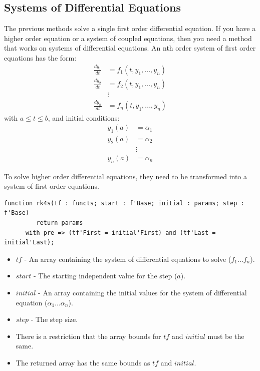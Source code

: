 \documentclass[10pt, openany]{book}
\newcommand{\indexfunc}[1]{\index[func]{#1}}
\begin{document}
\subsection{Systems of Differential Equations}
The previous methods solve a single first order differential equation.  If you have a higher order equation or a system of coupled equations, then you need a method that works on systems of differential equations.  An nth order system of first order equations has the form:
\begin{align*}
  \frac{dy_1}{dt} &= f_1(t, y_1, ..., y_n) \\
  \frac{dy_2}{dt} &= f_2(t, y_1, ..., y_n) \\
  &\vdots\\
  \frac{dy_n}{dt} &= f_n(t, y_1, ..., y_n)
\end{align*}
with $a\leq t\leq b$, and initial conditions:
\begin{align*}
  y_1(a) &= \alpha_1 \\
  y_2(a) &= \alpha_2 \\
  &\vdots \\
  y_n(a) &= \alpha_n
\end{align*}

To solve higher order differential equations, they need to be transformed into a system of first order equations.

\begin{lstlisting}
function rk4s(tf : functs; start : f'Base; initial : params; step : f'Base)
         return params
      with pre => (tf'First = initial'First) and (tf'Last = initial'Last);
\end{lstlisting}
\indexfunc{ode-rks}
\begin{itemize}
  \item $tf$ - An array containing the system of differential equations to solve ($f_1 ... f_n$).
  \item $start$ - The starting independent value for the step ($a$).
  \item $initial$ - An array containing the initial values for the system of differential equation ($\alpha_1 ... \alpha_n$).
  \item $step$ - The step size.
  \item There is a restriction that the array bounds for $tf$ and $initial$ must be the same.
  \item The returned array has the same bounds as $tf$ and $initial$.
\end{itemize}

\end{document}
